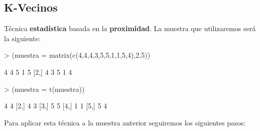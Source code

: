 \documentclass [a4paper] {article}
\begin{document}
\subsection{K-Vecinos}
Técnica \textbf{estadística} basada en la \textbf{proximidad}. La muestra que utilizaremos será la siguiente:
\begin{Schunk}
\begin{Sinput}
> (muestra = matrix(c(4,4,4,3,5,5,1,1,5,4),2,5))
\end{Sinput}
\begin{Soutput}
     [,1] [,2] [,3] [,4] [,5]
[1,]    4    4    5    1    5
[2,]    4    3    5    1    4
\end{Soutput}
\begin{Sinput}
> (muestra = t(muestra))
\end{Sinput}
\begin{Soutput}
     [,1] [,2]
[1,]    4    4
[2,]    4    3
[3,]    5    5
[4,]    1    1
[5,]    5    4
\end{Soutput}
\end{Schunk}
Para aplicar esta técnica a la muestra anterior seguiremos los siguientes pasos:
\end{document}
